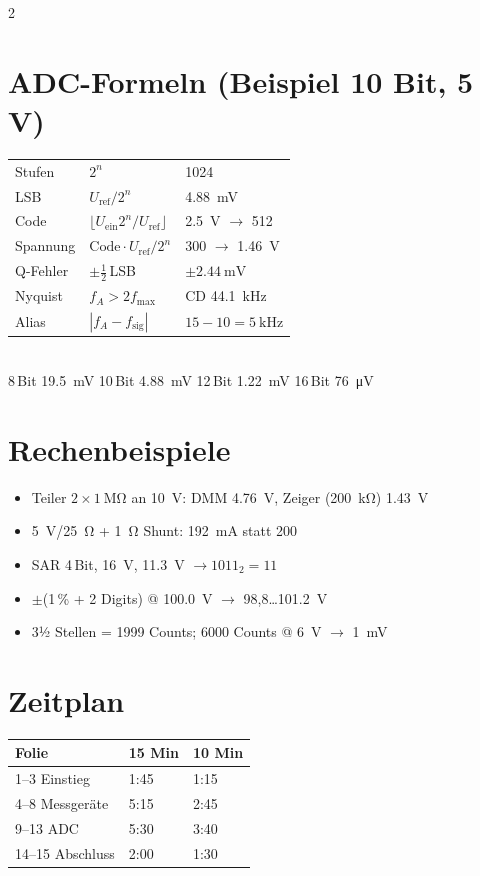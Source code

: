 \documentclass[11pt]{extarticle}
\begin{document}
\begin{multicols}{2}
\columnbreak
\section*{ADC-Formeln (Beispiel 10 Bit, 5 V)}
\small\begin{tabular}{@{}lll@{}}
\toprule
Stufen & $2^n$ & 1024\\
LSB & $U_\text{ref}/2^n$ & \SI{4.88}{\milli\volt}\\
Code & $\lfloor U_\text{ein}2^n/U_\text{ref}\rfloor$ & \SI{2.5}{\volt} $\to$ 512\\
Spannung & $\text{Code}\cdot U_\text{ref}/2^n$ & 300 $\to$ \SI{1.46}{\volt}\\
Q-Fehler & $\pm\frac12$\,LSB & $\pm\SI{2.44}{\milli\volt}$\\
Nyquist & $f_A>2f_\text{max}$ & CD \SI{44.1}{\kilo\hertz}\\
Alias & $|f_A-f_\text{sig}|$ & $15-10=\SI{5}{\kilo\hertz}$\\
\bottomrule
\end{tabular}\normalsize\\[1mm]
8\,Bit \SI{19.5}{\milli\volt} \textbar{} 10\,Bit \SI{4.88}{\milli\volt} \textbar{} 12\,Bit \SI{1.22}{\milli\volt} \textbar{} 16\,Bit \SI{76}{\micro\volt}

\section*{Rechenbeispiele}
\begin{itemize}
\item Teiler $2\times\SI{1}{\mega\ohm}$ an \SI{10}{\volt}: DMM \SI{4.76}{\volt}, Zeiger (\SI{200}{\kilo\ohm}) \SI{1.43}{\volt}
\item \SI{5}{\volt}/\SI{25}{\ohm} + \SI{1}{\ohm} Shunt: \SI{192}{\milli\ampere} statt 200
\item SAR 4\,Bit, \SI{16}{\volt}, \SI{11.3}{\volt} $\to 1011_2 = 11$
\item $\pm$(1\,\% + 2 Digits) @ \SI{100.0}{\volt} $\to$ 98,8\dots\SI{101.2}{\volt}
\item 3½ Stellen = 1999 Counts; 6000 Counts @ \SI{6}{\volt} $\to$ \SI{1}{\milli\volt}
\end{itemize}

\section*{Zeitplan}
\small\begin{tabular}{@{}lll@{}}
Folie & 15 Min & 10 Min\\ \midrule
1--3 Einstieg & 1:45 & 1:15\\
4--8 Messgeräte & 5:15 & 2:45\\
9--13 ADC & 5:30 & 3:40\\
14--15 Abschluss & 2:00 & 1:30\\
\end{tabular}\normalsize
\end{multicols}
\end{document}
